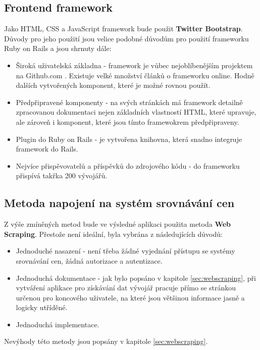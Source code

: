 \subsection{Frontend framework}
Jako HTML, CSS a JavaScript framework bude použit \textbf{Twitter Bootstrap}. Důvody pro jeho použití jsou velice podobné důvodům pro použití frameworku Ruby on Rails a jsou shrnuty dále:
\begin{itemize}
\item Široká uživatelská základna - framework je vůbec nejoblíbenějším projektem na Github.com \cite{website:github-popular}. Existuje velké množství článků o frameworku online. Hodně dalších vytvořených komponent, které je možné rovnou použít.
\item Předpřipravené komponenty - na svých stránkách má framework detailně zpracovanou dokumentaci nejen základních vlastností HTML, které upravuje, ale zároveň i komponent, které jsou tímto framewokrem předpřipraveny.
\item Plugin do Ruby on Rails - je vytvořena knihovna, která snadno integruje framework do Rails\cite{website:github-bootstrap-saas}.
\item Nejvíce přispěvovatelů a příspěvků do zdrojového kódu - do frameworku přispívá takřka 200 vývojářů.
\end{itemize}

\subsection{Metoda napojení na systém srovnávání cen}
Z výše zmíněných metod bude ve výsledné aplikaci použita metoda \textbf{Web Scraping}. Přestože není ideální, byla vybrána z následujících důvodů:
\begin{itemize}
\item Jednoduché nasazení - není třeba žádné vyjednání přístupu se systémy srovnávání cen, žádná autorizace a autentizace.
\item Jednoduchá dokumentace - jak bylo popsáno v kapitole \ref{sec:webscraping}, při vytváření aplikace pro získávání dat vývojář pracuje přímo se stránkou určenou pro koncového uživatele, na které jsou většinou informace jasně a logicky utříděné.
\item Jednoduchá implementace.
\end{itemize}
Nevýhody této metody jsou popsány v kapitole \ref{sec:webscraping}.
